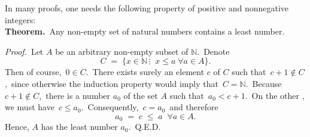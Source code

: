 \documentclass[12pt]{article}
\theoremstyle{definition}
\begin{document}
In many proofs, one needs the following property of positive and nonnegative integers:\\

\textbf{Theorem.}\, Any non-empty set of natural numbers contains a least number.

\emph{Proof.}\, Let $A$ be an arbitrary non-empty subset of $\mathbb{N}$.\, Denote
$$C \;=\; \{x \in \mathbb{N}\,\vdots\;\; x \leq a\; \forall a \in A\}.$$
Then of course,\, $0 \in C$.\, There exists surely an element $c$ of $C$ such that\, $c\!+\!1 \notin C$,\, since otherwise the induction property would imply that\, $C = \mathbb{N}$.\, Because\, $c\!+\!1 \notin C$,\, there is a number $a_0$ of the set $A$ such that\, $a_0 < c\!+\!1$.\, On the other , we must have\, $c \leq a_0$.\, Consequently,\, $c = a_0$\, and therefore
$$a_0 \;=\; c \;\leq\; a\;\; \forall a \in A.$$
Hence, $A$ has the least number $a_0$.\, Q.E.D.

\end{document}
